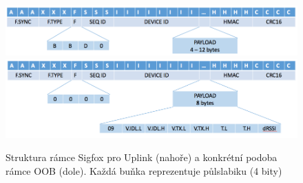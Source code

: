 \documentclass{ctuthesis}
\begin{document}
\begin{figure}
\caption{Struktura rámce Sigfox pro Uplink (nahoře) a konkrétní podoba rámce OOB (dole). Každá buňka reprezentuje půlslabiku (4 bity) \cite{sigfoxprotocol}}
\includegraphics[width=1\textwidth]{./images/SigfoxFrameRx.png}
\includegraphics[width=1\textwidth]{./images/SigfoxFrameOobRx.png}
\label{sigfoxRxRamce}
\end{figure}
\end{document}
